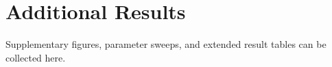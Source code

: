 \chapter{Additional Results}

Supplementary figures, parameter sweeps, and extended result tables can be
collected here.

